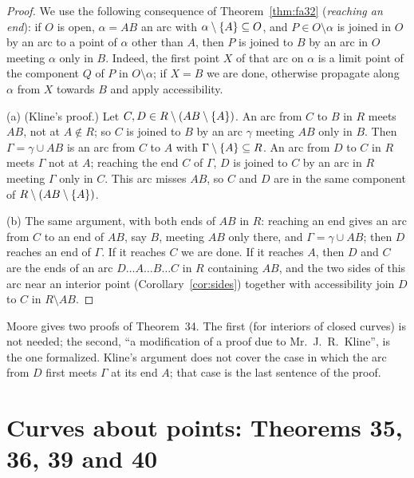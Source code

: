 \begin{proof}
We use the following consequence of Theorem~\ref{thm:fa32} (\emph{reaching an end}): if $O$ is open, $\alpha=AB$ an arc
with $\alpha\setminus\left\{ A \right\}\subseteq O$, and $P\in O\setminus\alpha$ is joined in $O$ by an arc to a point of $\alpha$ other
than $A$, then $P$ is joined to $B$ by an arc in $O$ meeting $\alpha$ only in $B$. Indeed, the first point $X$ of that arc on
$\alpha$ is a limit point of the component $Q$ of $P$ in $O\setminus\alpha$; if $X=B$ we are done, otherwise propagate along
$\alpha$ from $X$ towards $B$ and apply accessibility.

(a) (Kline's proof.) Let $C,D\in R\setminus(AB\setminus\left\{ A \right\})$. An arc from $C$ to $B$ in $R$ meets $AB$, not at
$A\notin R$; so $C$ is joined to $B$ by an arc $\gamma$ meeting $AB$ only in $B$. Then $\Gamma=\gamma\cup AB$ is an arc from
$C$ to $A$ with $\Gamma\setminus\left\{ A \right\}\subseteq R$. An arc from $D$ to $C$ in $R$ meets $\Gamma$ not at $A$; reaching the end $C$
of $\Gamma$, $D$ is joined to $C$ by an arc in $R$ meeting $\Gamma$ only in $C$. This arc misses $AB$, so $C$ and $D$ are in the
same component of $R\setminus(AB\setminus\left\{ A \right\})$.

(b) The same argument, with both ends of $AB$ in $R$: reaching an end gives an arc from $C$ to an end of $AB$, say $B$,
meeting $AB$ only there, and $\Gamma=\gamma\cup AB$; then $D$ reaches an end of $\Gamma$. If it reaches $C$ we are done. If it
reaches $A$, then $D$ and $C$ are the ends of an arc $D\dots A\dots B\dots C$ in $R$ containing $AB$, and the two sides of this
arc near an interior point (Corollary~\ref{cor:sides}) together with accessibility join $D$ to $C$ in $R\setminus AB$.
\end{proof}


Moore gives two proofs of Theorem~34. The first (for interiors of closed curves) is not needed; the second, ``a
modification of a proof due to Mr.~J.~R.~Kline'', is the one formalized. Kline's argument does not cover the case in
which the arc from $D$ first meets $\Gamma$ at its end $A$; that case is the last sentence of the proof.

\section{Curves about points: Theorems 35, 36, 39 and 40}

